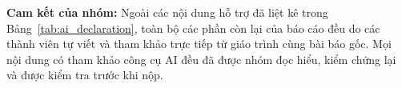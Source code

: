 \documentclass[oneside,a4paper,12pt]{extarticle}
\begin{document}
\par\vspace{2pt}\noindent\textbf{Cam kết của nhóm:} Ngoài các nội dung hỗ trợ đã liệt kê trong Bảng~\ref{tab:ai_declaration}, toàn bộ các phần còn lại của báo cáo đều do các thành viên tự viết và tham khảo trực tiếp từ giáo trình cùng bài báo gốc. Mọi nội dung có tham khảo công cụ AI đều đã được nhóm đọc hiểu, kiểm chứng lại và được kiểm tra trước khi nộp.
\end{document}
